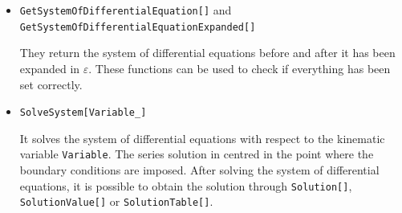 \documentclass[final,1p,times]{elsarticle}
\begin{document}
\begin{itemize}
\begin{itemize}
        \item \texttt{Variables\_}: the list of variables appear in the equations, together with their Feynman prescriptions.\\
        \textit{Example:}
\begin{Verbatim}[commandchars=\\\{\}]
\{  x - I \textdelta, y + I \textdelta \} 
\end{Verbatim}       
        
        \item \texttt{PointBC\_}: the point in the phase-space in which the boundary conditions are imposed.\\
        \textit{Example:}
\begin{Verbatim}[commandchars=\\\{\}]
\{ 1, 1 \} 
\end{Verbatim}           
        
        \item \texttt{Param\_}: this is an optional parameter. Some equations might contain some external parameters, for example some masses \texttt{Mw}, \texttt{Mz}. This substitutions are performed before solving the system.\\
        \textit{Example:}
\begin{Verbatim}[commandchars=\\\{\}]
\{ MW -> 80.38, MZ -> 91.19 \} 
\end{Verbatim}        
    \end{itemize}
    
    \item \texttt{GetSystemOfDifferentialEquation[]} and\\ \texttt{GetSystemOfDifferentialEquationExpanded[]}
    
    They return the system of differential equations before and after it has been expanded in $\varepsilon$. These functions can be used to check if everything has been set correctly.
    
    \item \texttt{SolveSystem[Variable\_]} 
    
    It solves the system of differential equations with respect to the kinematic variable \texttt{Variable}. The series solution in centred in the point where the boundary conditions are imposed. After solving the system of differential equations, it is possible to obtain the solution through \texttt{Solution[]}, \texttt{SolutionValue[]} or \texttt{SolutionTable[]}.
    

\end{itemize}
\end{document}
